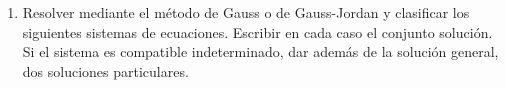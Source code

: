 \documentclass[11pt]{article}
\begin{document}
\begin{enumerate}[\hspace{-5mm} 1) ]
\begin{enumerate}[a)]
\end{enumerate}



























\item Resolver mediante el método de Gauss o de Gauss-Jordan y clasificar los siguientes sistemas de ecuaciones. Escribir en cada caso el conjunto solución. Si el sistema es compatible indeterminado, dar además de la solución general, dos soluciones particulares.

\begin{enumerate}[i)]
\end{enumerate}
\end{enumerate}
\end{document}
